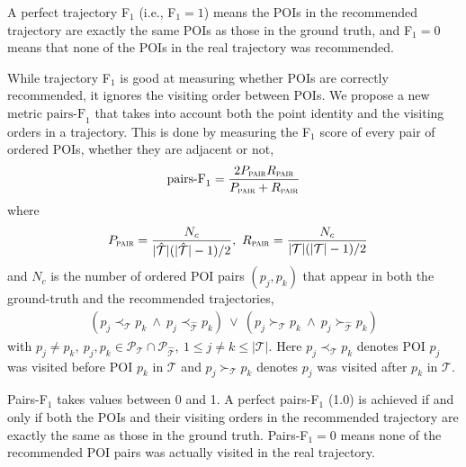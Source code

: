 A perfect trajectory F$_1$ (i.e., F$_1 = 1$) means the POIs in
the recommended trajectory are exactly the same POIs as those in the ground truth,
and F$_1 = 0$ means that none of the POIs in the
real trajectory was recommended.

While trajectory F$_1$ is good at measuring whether POIs are correctly recommended,
it ignores the visiting order between POIs.
We propose a new metric $\text{pairs-F}_1$ that takes into account
both the point identity and the visiting orders in a trajectory.
This is done by measuring the F$_1$ score of every pair of ordered POIs, whether they are adjacent or not,
\begin{displaymath}
\text{pairs-F}_1 = \frac{2 P_{\textsc{pair}} R_{\textsc{pair}}}
                       {P_{\textsc{pair}} + R_{\textsc{pair}}}
\end{displaymath}
where
\vspace{-2.0em}
\begin{displaymath}%
~~
P_{\textsc{pair}} = \frac{N_c} {|\hat{\mathcal{T}}|(|\hat{\mathcal{T}}|-1) / 2}, ~
R_{\textsc{pair}} = \frac{N_c} {|\mathcal{T}|(|\mathcal{T}|-1) / 2}
\end{displaymath}
and $N_c$ is the number of ordered POI pairs $(p_j, p_k)$ that
appear in both the ground-truth and the recommended trajectories,
\begin{align*}
    (p_j \prec_{\mathcal{T}} p_k ~\land~ p_j \prec_{\hat{\mathcal{T}}} p_k)  ~\lor~
    (p_j \succ_{\mathcal{T}} p_k ~\land~ p_j \succ_{\hat{\mathcal{T}}} p_k) 
\end{align*}
with $p_j \ne p_k, ~p_j, p_k \in \mathcal{P}_{\mathcal{T}} \cap \mathcal{P}_{\hat{\mathcal{T}}}, ~1 \le j \ne k \le |\mathcal{T}|$.
Here $p_j \prec_{\mathcal{T}} p_k$ denotes POI $p_j$ was visited before POI $p_k$ in $\mathcal{T}$
and $p_j \succ_{\mathcal{T}} p_k$ denotes $p_j$ was visited after $p_k$ in $\mathcal{T}$.

Pairs-F$_1$ takes values between 0 and 1. A perfect pairs-F$_1$ (1.0) is achieved if and only if
both the POIs and their visiting orders in the
recommended trajectory are exactly the same as those in the ground truth.
Pairs-F$_1 = 0$ means none of the recommended POI pairs was actually visited in the real trajectory.





